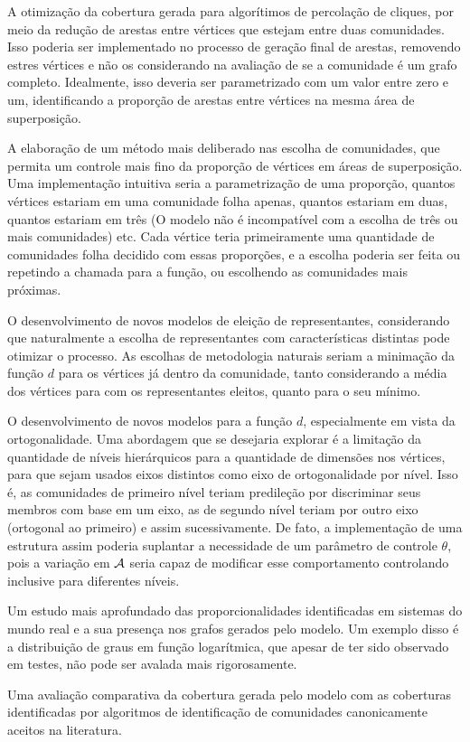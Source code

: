 \documentclass[notes.tex]{subfiles}
\begin{document}
A otimização da cobertura gerada para algorítimos de percolação de cliques, por meio da redução de arestas entre vértices que estejam entre duas comunidades.
Isso poderia ser implementado no processo de geração final de arestas, removendo estres vértices e não os considerando na avaliação de se a comunidade é um grafo completo.
Idealmente, isso deveria ser parametrizado com um valor entre zero e um, identificando a proporção de arestas entre vértices na mesma área de superposição.

A elaboração de um método mais deliberado nas escolha de comunidades, que permita um controle mais fino da proporção de vértices em áreas de superposição.
Uma implementação intuitiva seria a parametrização de uma proporção, quantos vértices estariam em uma comunidade folha apenas, quantos estariam em duas, quantos estariam em três (O modelo não é incompatível com a escolha de três ou mais comunidades) etc.
Cada vértice teria primeiramente uma quantidade de comunidades folha decidido com essas proporções, e a escolha poderia ser feita ou repetindo a chamada para a função, ou escolhendo as comunidades mais próximas.

O desenvolvimento de novos modelos de eleição de representantes, considerando que naturalmente a escolha de representantes com características distintas pode otimizar o processo.
As escolhas de metodologia naturais seriam a minimação da função $d$ para os vértices já dentro da comunidade, tanto considerando a média dos vértices para com os representantes eleitos, quanto para o seu mínimo.

O desenvolvimento de novos modelos para a função $d$, especialmente em vista da ortogonalidade.
Uma abordagem que se desejaria explorar é a limitação da quantidade de níveis hierárquicos para a quantidade de dimensões nos vértices, para que sejam usados eixos distintos como eixo de ortogonalidade por nível.
Isso é, as comunidades de primeiro nível teriam predileção por discriminar seus membros com base em um eixo, as de segundo nível teriam por outro eixo (ortogonal ao primeiro) e assim sucessivamente.
De fato, a implementação de uma estrutura assim poderia suplantar a necessidade de um parâmetro de controle  $\theta$, pois a variação em  $\operatorname{\mathcal{A}}$ seria capaz de modificar esse comportamento controlando inclusive para diferentes níveis.

Um estudo mais aprofundado das proporcionalidades identificadas em sistemas do mundo real e a sua presença nos grafos gerados pelo modelo.
Um exemplo disso é a distribuição de graus em função logarítmica, que apesar de ter sido observado em testes, não pode ser avalada mais rigorosamente.

Uma avaliação comparativa da cobertura gerada pelo modelo com as coberturas identificadas por algoritmos de identificação de comunidades canonicamente aceitos na literatura.
\end{document}

